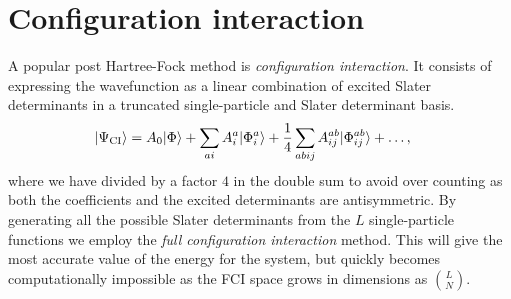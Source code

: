 \chapter{Configuration interaction}
     A popular post Hartree-Fock method is \textit{configuration interaction}.
     It consists of expressing the wavefunction as a linear combination of
     excited Slater determinants in a truncated single-particle and Slater
     determinant basis.
     \begin{align}
         | \Psi_{\text{CI}} \rangle
         &= A_0| \Phi \rangle
         + \sum_{ai}A^a_i| \Phi^{a}_{i} \rangle
         + \frac{1}{4}\sum_{abij}A^{ab}_{ij}| \Phi^{ab}_{ij} \rangle
         + \dots,
     \end{align}
     where we have divided by a factor $4$ in the double sum to avoid over
     counting as both the coefficients and the excited determinants are
     antisymmetric. By generating all the possible Slater determinants from the
     $L$ single-particle functions we employ the \textit{full configuration
     interaction} method. This will give the most accurate value of the energy
     for the system, but quickly becomes computationally impossible as the FCI
     space grows in dimensions as $\binom{L}{N}$.
     \cite{kvaal2017notes}

